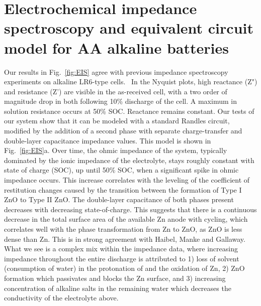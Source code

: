 \chapter{Electrochemical impedance spectroscopy and equivalent circuit model for AA alkaline batteries\label{ch:eis}}

Our results in Fig.~\ref{fig:EIS} agree with previous impedance spectroscopy experiments on alkaline LR6-type cells.~\cite{wang,root} In the Nyquist plots, high reactance (Z") and resistance (Z') are visible in the as-received cell, with a two order of magnitude drop in both following 10\% discharge of the cell. A maximum in solution resistance occurs at 50\% SOC. Reactance remains constant. Our tests of our system show that it can be modeled with a standard Randles circuit, modified by the addition of a second phase with separate charge-transfer and double-layer capacitance impedance values. This model is shown in Fig.~\ref{fig:EIS}a. Over time, the ohmic impedance of the system, typically dominated by the ionic impedance of the electrolyte, stays roughly constant with state of charge (SOC), up until 50\% SOC, when a significant spike in ohmic impedance occurs. This increase correlates with the leveling of the coefficient of restitution changes caused by the transition between the formation of Type I ZnO to Type II ZnO. The double-layer capacitance of both phases present decreases with decreasing state-of-charge. This suggests that there is a continuous decrease in the total surface area of the available Zn anode with cycling, which correlates well with the phase transformation from Zn to ZnO, as ZnO is less dense than Zn. This is in strong agreement with Haibel, Manke and Gallaway.~\cite{haibel,Manke2007-yj,gallaway}  What we see is a complex mix within the impedance data, where increasing impedance throughout the entire discharge is attributed to 1) loss of solvent (consumption of water) in the protonation of  and the oxidation of Zn, 2) ZnO formation which passivates and blocks the Zn surface, and 3) increasing concentration of alkaline salts in the remaining water which decreases the conductivity of the electrolyte above.~\cite{linden}

